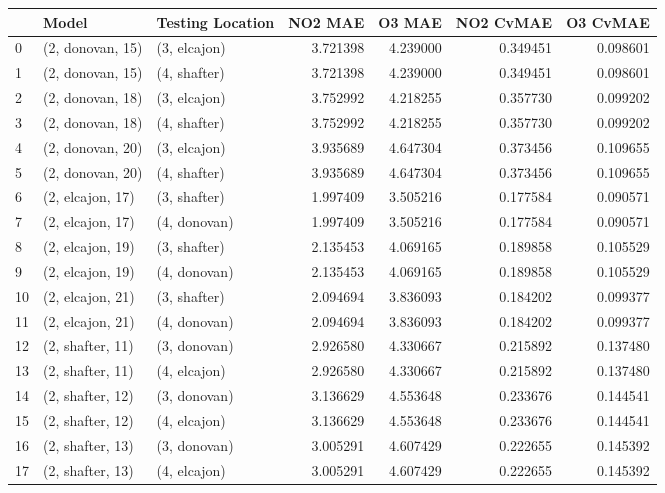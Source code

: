 \begin{tabular}{lllrrrr}
\toprule
{} &             Model & Testing Location &   NO2 MAE &    O3 MAE &  NO2 CvMAE &  O3 CvMAE \\
\midrule
0  &  (2, donovan, 15) &     (3, elcajon) &  3.721398 &  4.239000 &   0.349451 &  0.098601 \\
1  &  (2, donovan, 15) &     (4, shafter) &  3.721398 &  4.239000 &   0.349451 &  0.098601 \\
2  &  (2, donovan, 18) &     (3, elcajon) &  3.752992 &  4.218255 &   0.357730 &  0.099202 \\
3  &  (2, donovan, 18) &     (4, shafter) &  3.752992 &  4.218255 &   0.357730 &  0.099202 \\
4  &  (2, donovan, 20) &     (3, elcajon) &  3.935689 &  4.647304 &   0.373456 &  0.109655 \\
5  &  (2, donovan, 20) &     (4, shafter) &  3.935689 &  4.647304 &   0.373456 &  0.109655 \\
6  &  (2, elcajon, 17) &     (3, shafter) &  1.997409 &  3.505216 &   0.177584 &  0.090571 \\
7  &  (2, elcajon, 17) &     (4, donovan) &  1.997409 &  3.505216 &   0.177584 &  0.090571 \\
8  &  (2, elcajon, 19) &     (3, shafter) &  2.135453 &  4.069165 &   0.189858 &  0.105529 \\
9  &  (2, elcajon, 19) &     (4, donovan) &  2.135453 &  4.069165 &   0.189858 &  0.105529 \\
10 &  (2, elcajon, 21) &     (3, shafter) &  2.094694 &  3.836093 &   0.184202 &  0.099377 \\
11 &  (2, elcajon, 21) &     (4, donovan) &  2.094694 &  3.836093 &   0.184202 &  0.099377 \\
12 &  (2, shafter, 11) &     (3, donovan) &  2.926580 &  4.330667 &   0.215892 &  0.137480 \\
13 &  (2, shafter, 11) &     (4, elcajon) &  2.926580 &  4.330667 &   0.215892 &  0.137480 \\
14 &  (2, shafter, 12) &     (3, donovan) &  3.136629 &  4.553648 &   0.233676 &  0.144541 \\
15 &  (2, shafter, 12) &     (4, elcajon) &  3.136629 &  4.553648 &   0.233676 &  0.144541 \\
16 &  (2, shafter, 13) &     (3, donovan) &  3.005291 &  4.607429 &   0.222655 &  0.145392 \\
17 &  (2, shafter, 13) &     (4, elcajon) &  3.005291 &  4.607429 &   0.222655 &  0.145392 \\

\end{tabular}
